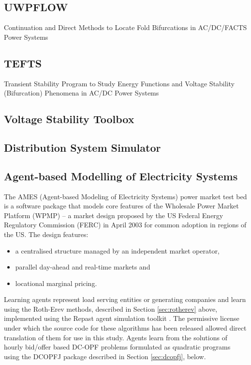 \subsection{UWPFLOW}
Continuation and Direct Methods to Locate Fold Bifurcations in AC/DC/FACTS
Power Systems

\subsection{TEFTS}
Transient Stability Program to Study Energy Functions and Voltage Stability
(Bifurcation) Phenomena in AC/DC Power Systems

\subsection{Voltage Stability Toolbox}

\subsection{Distribution System Simulator}

\subsection{Agent-based Modelling of Electricity Systems}
\label{sec:ames}
The AMES (Agent-based Modeling of Electricity Systems) power market test bed is
a software package that models core features of the Wholesale Power Market
Platform (WPMP) -- a market design proposed by the US Federal Energy Regulatory
Commission (FERC) in April 2003 for common adoption in regions of the
US\cite{tesfatsi:wpmp}. The design features:
\begin{itemize}
  \item a centralised structure managed by an independent market operator,
  \item parallel day-ahead and real-time markets and
  \item locational marginal pricing.
\end{itemize}
Learning agents represent load serving entities or generating companies and
learn using the Roth-Erev methods, described in Section \ref{sec:rotherev}
above, implemented using the Repast agent simulation toolkit
\cite{gieseler:thesis}.  The permissive license under which the source code for
these algorithms has been released allowed direct translation of them for use
in this study.  Agents learn from the solutions of hourly bid/offer based
DC-OPF problems formulated as quadratic programs using the DCOPFJ package
\cite{tesfatsi:dcopf} described in Section \ref{sec:dcopfj}, below.

